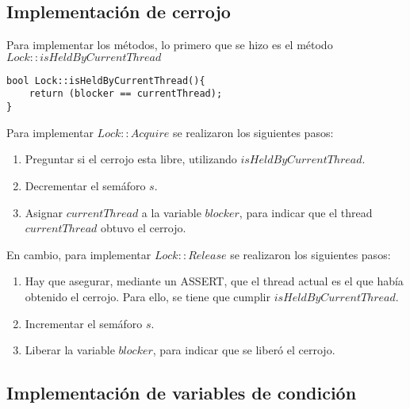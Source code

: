 \subsection*{Implementación de cerrojo}
Para implementar los métodos, lo primero que se hizo es el método $Lock::isHeldByCurrentThread$
\begin{lstlisting}[style=C]
bool Lock::isHeldByCurrentThread(){
    return (blocker == currentThread);
}
\end{lstlisting}
Para implementar $Lock::Acquire$ se realizaron los siguientes pasos:
\begin{enumerate}
	\item Preguntar si el cerrojo esta libre, utilizando $isHeldByCurrentThread$.
	\item Decrementar el semáforo $s$.
	\item Asignar $currentThread$ a la variable $blocker$, para indicar que el thread $currentThread$ obtuvo el cerrojo.
\end{enumerate}
En cambio, para implementar $Lock::Release$ se realizaron los siguientes pasos:
\begin{enumerate}
	\item Hay que asegurar, mediante un ASSERT, que el thread actual es el que había obtenido el cerrojo. Para ello, se tiene que cumplir $isHeldByCurrentThread$.
	\item Incrementar el semáforo $s$.
	\item Liberar la variable $blocker$, para indicar que se liberó el cerrojo.
\end{enumerate}
\subsection*{Implementación de variables de condición}